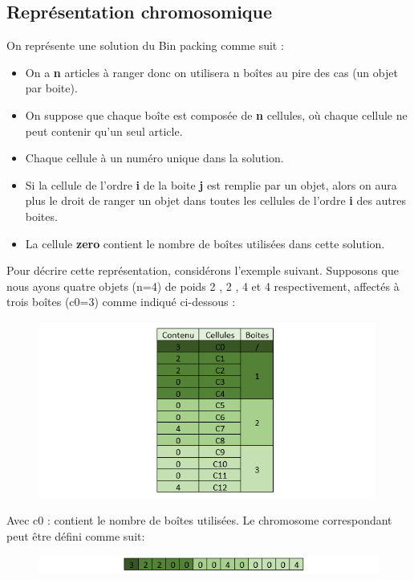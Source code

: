\documentclass{article}
\begin{document}
\subsection{Représentation chromosomique}
On représente une solution du Bin packing comme suit \cite{mohamadi2010application} : 
\begin{itemize}
	\item On a \textbf{n} articles à ranger donc on utilisera n boîtes au pire des cas (un objet par boite).
	\item On suppose que chaque boîte est composée de \textbf{n} cellules, où chaque cellule ne peut contenir qu’un seul article.
	\item Chaque cellule à un numéro unique dans la solution.
	\item Si la cellule de l’ordre \textbf{i} de la boite \textbf{j} est remplie par un objet, alors on aura plus le droit de ranger un objet dans toutes les cellules de l’ordre \textbf{i} des autres boites.
	\item La cellule \textbf{zero} contient le nombre de boîtes utilisées dans cette solution.
\end{itemize}
Pour décrire cette représentation, considérons l'exemple suivant. Supposons que nous ayons quatre objets (n=4) de poids 2 , 2 , 4 et 4 respectivement, affectés à trois boîtes  (c0=3)  comme indiqué ci-dessous :
\begin{figure}[H]
  \includegraphics[width=\linewidth]{../figures/pic01.PNG}
\end{figure}
Avec c0 : contient le nombre de boîtes utilisées.
\newline
Le chromosome correspondant peut être défini comme suit:
\begin{figure}[H]
  \includegraphics[width=\linewidth]{../figures/pic02.PNG}
\end{figure}
\end{document}
